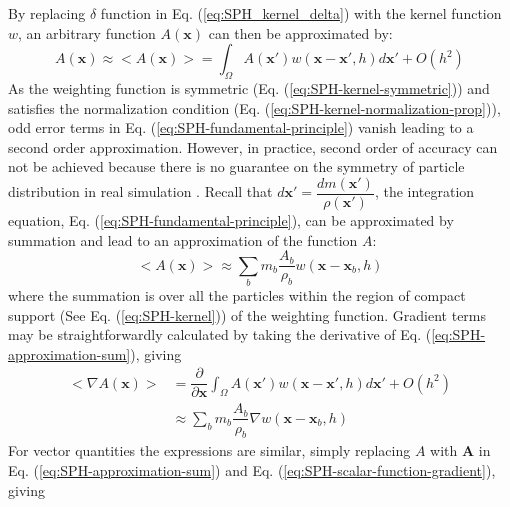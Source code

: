 By replacing $\delta$ function in Eq. (\ref{eq:SPH_kernel_delta}) with the kernel function $w$, an arbitrary function $A\left(\textbf{x}\right)$ can then be approximated by:
\begin{equation}
A\left(\textbf{x}\right) \approx <A\left(\textbf{x}\right)> = \int_{\Omega} A\left(\textbf{x} \prime\right) w\left(\textbf{x}-\textbf{x}\prime, h\right) d\textbf{x}\prime + O\left(h^2\right)
\label{eq:SPH-fundamental-principle}
\end{equation}
As the weighting function is symmetric (Eq. (\ref{eq:SPH-kernel-symmetric})) and satisfies the normalization condition (Eq. (\ref{eq:SPH-kernel-normalization-prop})), odd error terms in Eq. (\ref{eq:SPH-fundamental-principle}) vanish leading to a second order approximation. However, in practice, second order of accuracy can not be achieved because there is no guarantee on the symmetry of particle distribution in real simulation \citep{price2012smoothed}.
Recall that $d\textbf{x}\prime = \dfrac{dm (\textbf{x} \prime)}{\rho (\textbf{x} \prime)}$, the integration equation, Eq. (\ref{eq:SPH-fundamental-principle}), can be approximated by summation and lead to an approximation of the function $A$:
\begin{equation}
<A\left(\textbf{x}\right)> \approx \sum_b m_b \dfrac{A_b}{\rho_b} w\left(\textbf{x}-\textbf{x}_b, h\right)
\label{eq:SPH-approximation-sum}
\end{equation}
where the summation is over all the particles within the region of compact support (See Eq. (\ref{eq:SPH-kernel})) of the weighting function. 
Gradient terms may be straightforwardly calculated by taking the derivative of Eq. (\ref{eq:SPH-approximation-sum}), giving
\begin{equation}
\begin{split}
<\nabla A\left(\textbf{x}\right)> & = \dfrac{\partial }{\partial \textbf{x}} \int_{\Omega} A\left(\textbf{x} \prime\right) w\left(\textbf{x}-\textbf{x}\prime, h\right) d\textbf{x}\prime + O\left(h^2\right) \\
& \approx \sum_b m_b \dfrac{A_b}{\rho_b} \nabla w\left(\textbf{x} - \textbf{x}_b, h\right)
\end{split} 
\label{eq:SPH-scalar-function-gradient}
\end{equation}
For vector quantities the expressions are similar, simply replacing $A$ with $\textbf{A}$ in Eq. (\ref{eq:SPH-approximation-sum}) and Eq. (\ref{eq:SPH-scalar-function-gradient}), giving
